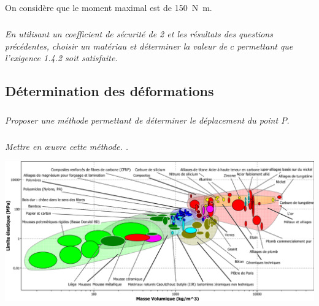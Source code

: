 \documentclass[10pt,fleqn]{article} %
\begin{document}
\begin{multicols}{2}
On considère que le moment maximal est de \SI{150}{N.m}. 
\subparagraph{}\textit{En utilisant un coefficient de sécurité de 2 et les résultats des questions précédentes, choisir un matériau et déterminer la valeur de $c$  permettant que l’exigence 1.4.2 soit satisfaite.}


\subsection*{Détermination des déformations}

\subparagraph{}\textit{Proposer une méthode permettant de déterminer le déplacement du point $P$.}

\subparagraph{}\textit{Mettre en \oe{}uvre cette méthode. .}
\end{multicols}


\begin{center}
\includegraphics[width=\linewidth]{images/fig_07}
\end{center}
\end{document}
